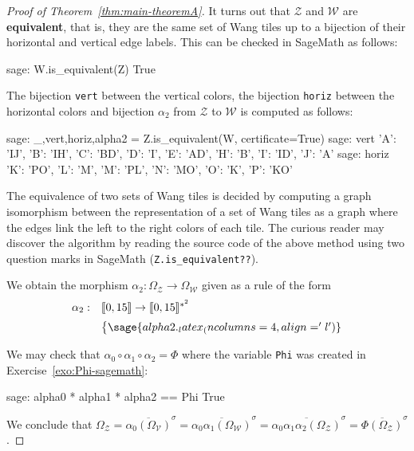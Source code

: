 \documentclass[12pt]{amsart}
\newcommand{\Vcal}{\mathcal{V}}
\newcommand{\Wcal}{\mathcal{W}}
\newcommand{\Zcal}{\mathcal{Z}}
\newcommand{\shiftclosure}[1]{{\overline{#1}^{\sigma}}}
\newcommand{\Zrange}[1]{\llbracket0,#1\rrbracket}
\newcommand{\ifnv}[2]{\ifthenelse{\equal{#1}{}}{}{#2}}
\newcommand\defn[2][]{\ifnv{#1}{\index{#1|\textbf}}{\index{#2|\textbf}}\textbf{#2}}
\begin{document}
\begin{proof}[Proof of Theorem~\ref{thm:main-theoremA}]
It turns out that $\Zcal$ and $\Wcal$ are \defn{equivalent},
that is, they are the same set of Wang tiles up to 
a bijection of their horizontal and vertical edge labels.
This can be checked in SageMath as follows:
\begin{sagecommandlinetcb}
\begin{sagecommandline}
sage: W.is_equivalent(Z)
True
\end{sagecommandline}
\end{sagecommandlinetcb}
    \noindent
The bijection \texttt{vert} between the vertical colors,
the bijection \texttt{horiz} between the horizontal colors
and bijection $\alpha_2$ from $\Zcal$ to $\Wcal$ is computed as follows:
\begin{sagecommandlinetcb}
\begin{sagecommandline}
sage: _,vert,horiz,alpha2 = Z.is_equivalent(W, certificate=True)
sage: vert
{'A': 'IJ', 'B': 'IH', 'C': 'BD', 'D': 'I', 'E': 'AD', 'H': 'B', 'I': 'ID', 'J': 'A'}
sage: horiz
{'K': 'PO', 'L': 'M', 'M': 'PL', 'N': 'MO', 'O': 'K', 'P': 'KO'}
\end{sagecommandline}
\end{sagecommandlinetcb}
    \noindent
The equivalence of two sets of Wang tiles is decided by computing a graph
isomorphism between the representation of a set of Wang tiles as a graph where
the edges link the left to the right colors of each tile.
The curious reader may discover the algorithm by reading the source code 
of the above method using two question marks in SageMath
(\texttt{Z.is\_equivalent??}).

We obtain the morphism $\alpha_2:\Omega_\Zcal\to\Omega_\Wcal$ given as a rule of the form
\[
\begin{array}{ll}
    \alpha_2:&\Zrange{15}\to\Zrange{15}^{*^2}\\[2mm]
    &\left\{\arraycolsep=1.8pt
                \sage{alpha2._latex_(ncolumns=4, align='l')}
    \right.
\end{array}
\]

We may check that $\alpha_0\circ\alpha_1\circ\alpha_2=\Phi$
where the variable \texttt{Phi} was created in Exercise~\ref{exo:Phi-sagemath}:
\begin{sagecommandlinetcb}
\begin{sagecommandline}
sage: alpha0 * alpha1 * alpha2 == Phi
True
\end{sagecommandline}
\end{sagecommandlinetcb}
\noindent
We conclude that
$\Omega_\Zcal
    =\shiftclosure{\alpha_0(\Omega_\Vcal)}
    =\shiftclosure{\alpha_0\alpha_1(\Omega_\Wcal)}
    =\shiftclosure{\alpha_0\alpha_1\alpha_2(\Omega_\Zcal)}
    =\shiftclosure{\Phi(\Omega_\Zcal)}$.
\end{proof}
\end{document}
